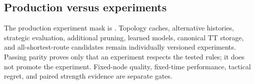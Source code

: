 \subsection{Production versus experiments}
The production experiment mask is \ProductionMask. Topology caches, alternative histories, strategic evaluation, additional pruning, learned models, canonical TT storage, and all-shortest-route candidates remain individually versioned experiments. Passing parity proves only that an experiment respects the tested rules; it does not promote the experiment. Fixed-node quality, fixed-time performance, tactical regret, and paired strength evidence are separate gates.
